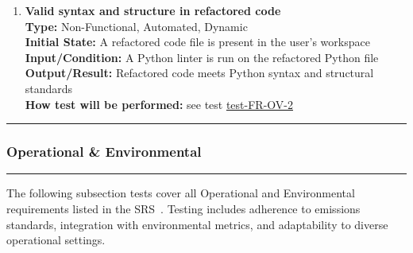 \documentclass[12pt, titlepage]{article}
\newcommand{\colorrule}{\textcolor{BlueViolet}{\rule{\linewidth}{2pt}}}
\begin{document}
\begin{enumerate}[label={\bf \textcolor{Maroon}{test-PF-\arabic*}},
      wide=0pt, font=\itshape]
    \item \textbf{Valid syntax and structure in refactored code} \\[2mm]
      \textbf{Type:} Non-Functional, Automated, Dynamic \\
      \textbf{Initial State:} A refactored code file is present in
      the user's workspace \\
      \textbf{Input/Condition:} A Python linter is run on the
      refactored Python file \\
      \textbf{Output/Result:} Refactored code meets Python syntax and
      structural standards \\[2mm]
      \textbf{How test will be performed:} see test
      \hyperref[itm:FR-OV-2]{test-FR-OV-2}

  \end{enumerate}

  \noindent
  \colorrule

  \subsubsection{Operational \& Environmental}
  \colorrule

  \medskip

  \noindent
  The following subsection tests cover all Operational and
  Environmental requirements listed in the SRS~\cite{SRS}. Testing
  includes adherence to emissions standards, integration with
  environmental metrics, and adaptability to diverse operational settings.
\end{document}
